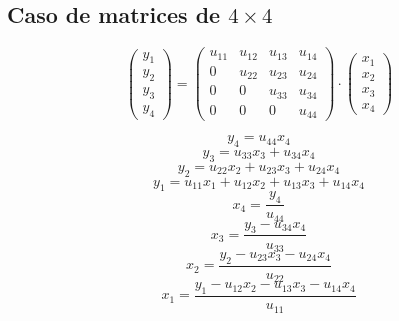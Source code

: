 \documentclass[10pt,a4paper,dvipdfmx]{article}
\begin{document}
\subsection{Caso de matrices de $4\times 4$ }
$$ \left( 
\begin{array}{c}
y_{1} \\
y_{2} \\
y_{3} \\
y_{4} 
 \end{array}
\right)
 = \left( 
\begin{array}{cccc}
u_{{1}{1}} & u_{{1}{2}} & u_{{1}{3}} & u_{{1}{4}} \\
0 & u_{{2}{2}} & u_{{2}{3}} & u_{{2}{4}} \\
0 & 0 & u_{{3}{3}} & u_{{3}{4}} \\
0 & 0 & 0 & u_{{4}{4}} 
 \end{array}
\right)
 \cdot \left( 
\begin{array}{c}
x_{1} \\
x_{2} \\
x_{3} \\
x_{4} 
 \end{array}
\right)
 $$
\begin{multicols}{2}
$$ y_{4} = u_{{4}{4}} x_{4} $$
$$ y_{3} = u_{{3}{3}} x_{3} + u_{{3}{4}} x_{4} $$
$$ y_{2} = u_{{2}{2}} x_{2} + u_{{2}{3}} x_{3} + u_{{2}{4}} x_{4} $$
$$ y_{1} = u_{{1}{1}} x_{1} + u_{{1}{2}} x_{2} + u_{{1}{3}} x_{3} + u_{{1}{4}} x_{4} $$
\vfill\null
\columnbreak
$$ x_{4} = \dfrac{y_{4}}{u_{{4}{4}}} $$
$$ x_{3} = \dfrac{y_{3}- u_{{3}{4}} x_{4}}{u_{{3}{3}}} $$
$$ x_{2} = \dfrac{y_{2}- u_{{2}{3}} x_{3}- u_{{2}{4}} x_{4}}{u_{{2}{2}}} $$
$$ x_{1} = \dfrac{y_{1}- u_{{1}{2}} x_{2}- u_{{1}{3}} x_{3}- u_{{1}{4}} x_{4}}{u_{{1}{1}}} $$
\end{multicols}
\end{document}
